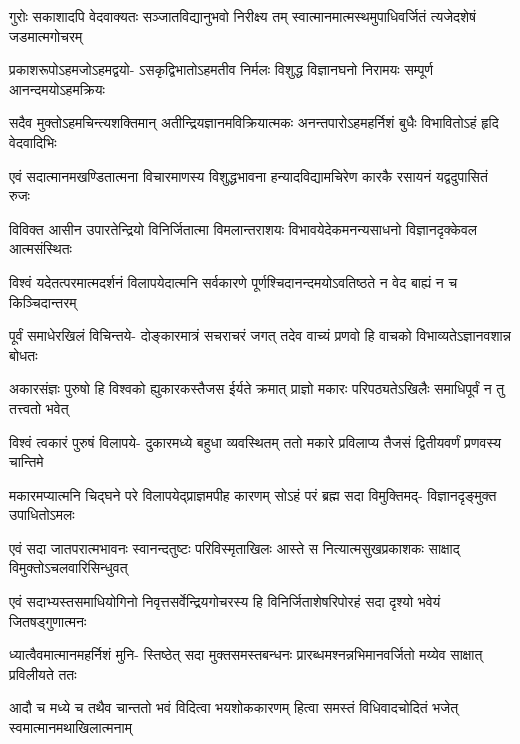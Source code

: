 \fourlineindentedshloka
{गुरोः सकाशादपि वेदवाक्यतः}
{सञ्जातविद्यानुभवो निरीक्ष्य तम्}
{स्वात्मानमात्मस्थमुपाधिवर्जितं}
{त्यजेदशेषं जडमात्मगोचरम्} %

\fourlineindentedshloka
{प्रकाशरूपोऽहमजोऽहमद्वयो-}
{ऽसकृद्विभातोऽहमतीव निर्मलः}
{विशुद्ध विज्ञानघनो निरामयः}
{सम्पूर्ण आनन्दमयोऽहमक्रियः} %

\fourlineindentedshloka
{सदैव मुक्तोऽहमचिन्त्यशक्तिमान्}
{अतीन्द्रियज्ञानमविक्रियात्मकः}
{अनन्तपारोऽहमहर्निशं बुधैः}
{विभावितोऽहं हृदि वेदवादिभिः} %

\fourlineindentedshloka
{एवं सदात्मानमखण्डितात्मना}
{विचारमाणस्य विशुद्धभावना}
{हन्यादविद्यामचिरेण कारकै}
{रसायनं यद्वदुपासितं रुजः} %

\fourlineindentedshloka
{विविक्त आसीन उपारतेन्द्रियो}
{विनिर्जितात्मा विमलान्तराशयः}
{विभावयेदेकमनन्यसाधनो}
{विज्ञानदृक्केवल आत्मसंस्थितः} %

\fourlineindentedshloka
{विश्वं यदेतत्परमात्मदर्शनं}
{विलापयेदात्मनि सर्वकारणे}
{पूर्णश्चिदानन्दमयोऽवतिष्ठते}
{न वेद बाह्यं न च किञ्चिदान्तरम्} %

\fourlineindentedshloka
{पूर्वं समाधेरखिलं विचिन्तये-}
{दोङ्कारमात्रं सचराचरं जगत्}
{तदेव वाच्यं प्रणवो हि वाचको}
{विभाव्यतेऽज्ञानवशान्न बोधतः} %

\fourlineindentedshloka
{अकारसंज्ञः पुरुषो हि विश्वको}
{ह्युकारकस्तैजस ईर्यते क्रमात्}
{प्राज्ञो मकारः परिपठ्यतेऽखिलैः}
{समाधिपूर्वं न तु तत्त्वतो भवेत्} %

\fourlineindentedshloka
{विश्वं त्वकारं पुरुषं विलापये-}
{दुकारमध्ये बहुधा व्यवस्थितम्}
{ततो मकारे प्रविलाप्य तैजसं}
{द्वितीयवर्णं प्रणवस्य चान्तिमे} %

\fourlineindentedshloka
{मकारमप्यात्मनि चिद्घने परे}
{विलापयेद्प्राज्ञमपीह कारणम्}
{सोऽहं परं ब्रह्म सदा विमुक्तिमद्-}
{विज्ञानदृङ्मुक्त उपाधितोऽमलः} %

\fourlineindentedshloka
{एवं सदा जातपरात्मभावनः}
{स्वानन्दतुष्टः परिविस्मृताखिलः}
{आस्ते स नित्यात्मसुखप्रकाशकः}
{साक्षाद् विमुक्तोऽचलवारिसिन्धुवत्} %

\fourlineindentedshloka
{एवं सदाभ्यस्तसमाधियोगिनो}
{निवृत्तसर्वेन्द्रियगोचरस्य हि}
{विनिर्जिताशेषरिपोरहं सदा}
{दृश्यो भवेयं जितषड्गुणात्मनः} %

\fourlineindentedshloka
{ध्यात्वैवमात्मानमहर्निशं मुनि-}
{स्तिष्ठेत् सदा मुक्तसमस्तबन्धनः}
{प्रारब्धमश्नन्नभिमानवर्जितो}
{मय्येव साक्षात् प्रविलीयते ततः} %

\fourlineindentedshloka
{आदौ च मध्ये च तथैव चान्ततो}
{भवं विदित्वा भयशोककारणम्}
{हित्वा समस्तं विधिवादचोदितं}
{भजेत् स्वमात्मानमथाखिलात्मनाम्} %

